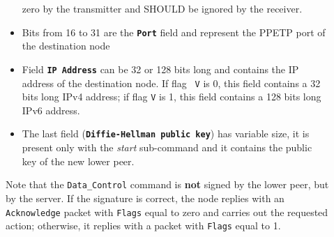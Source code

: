 \documentclass{rfc}
\newcommand{\ttbf}[1]{\texttt{\bfseries #1}}
\begin{document}
\begin{description}
\begin{itemize}
       zero by the transmitter and SHOULD be ignored by the receiver.
       \item Bits from 16 to 31 are the \ttbf{Port} field and
       represent the PPETP port of   the destination node
       \item Field \ttbf{IP Address} can be 32 or 128 bits long and 
       contains the IP address of the destination node.  If flag \texttt{
       V} is 0, this field contains a 32 bits long IPv4 address; if
       flag \texttt{V} is 1, this field contains a 128 bits long IPv6
       address.
       \item The last field (\ttbf{Diffie-Hellman public key}) has
       variable size, it is present only with the \emph{start}
       sub-command and it contains the public key of the new lower peer.
     \end{itemize}
  Note that the \texttt{Data\_Control} command is \textbf{not} signed by
  the lower peer, but by the server.  If the signature is correct, the
  node replies with an \texttt{Acknowledge} packet with \texttt{Flags}
  equal to zero and carries out the requested action; otherwise, it
  replies with a packet with \texttt{Flags} equal to 1.


\end{description}
\end{document}
